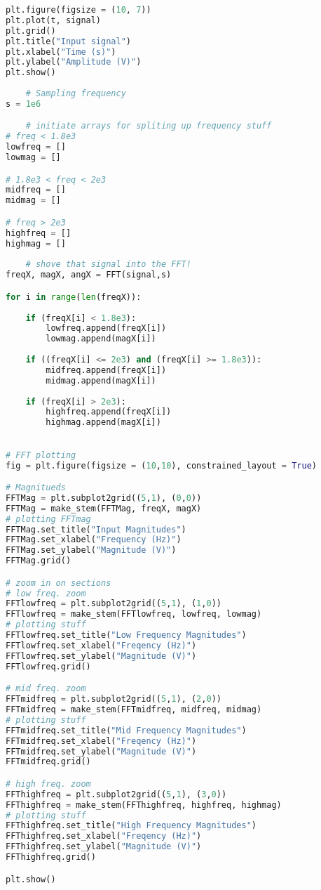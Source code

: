 \documentclass[12pt,a4paper]{article}
\begin{document}
\begin{lstlisting}[language=Python]
plt.figure(figsize = (10, 7))
plt.plot(t, signal)
plt.grid()
plt.title("Input signal")
plt.xlabel("Time (s)")
plt.ylabel("Amplitude (V)")
plt.show()
  
    # Sampling frequency
s = 1e6

    # initiate arrays for spliting up frequency stuff
# freq < 1.8e3
lowfreq = []
lowmag = []

# 1.8e3 < freq < 2e3
midfreq = []
midmag = []

# freq > 2e3 
highfreq = []
highmag = []
    
    # shove that signal into the FFT!
freqX, magX, angX = FFT(signal,s)

for i in range(len(freqX)):
    
    if (freqX[i] < 1.8e3):
        lowfreq.append(freqX[i])
        lowmag.append(magX[i])
    
    if ((freqX[i] <= 2e3) and (freqX[i] >= 1.8e3)):
        midfreq.append(freqX[i])
        midmag.append(magX[i])
        
    if (freqX[i] > 2e3):
        highfreq.append(freqX[i])
        highmag.append(magX[i])
        

# FFT plotting
fig = plt.figure(figsize = (10,10), constrained_layout = True)

# Magnitueds
FFTMag = plt.subplot2grid((5,1), (0,0))
FFTMag = make_stem(FFTMag, freqX, magX)
# plotting FFTmag
FFTMag.set_title("Input Magnitudes")
FFTMag.set_xlabel("Frequency (Hz)")
FFTMag.set_ylabel("Magnitude (V)")
FFTMag.grid()

# zoom in on sections
# low freq. zoom
FFTlowfreq = plt.subplot2grid((5,1), (1,0))
FFTlowfreq = make_stem(FFTlowfreq, lowfreq, lowmag)
# plotting stuff
FFTlowfreq.set_title("Low Frequency Magnitudes")
FFTlowfreq.set_xlabel("Freqency (Hz)")
FFTlowfreq.set_ylabel("Magnitude (V)")
FFTlowfreq.grid()

# mid freq. zoom
FFTmidfreq = plt.subplot2grid((5,1), (2,0))
FFTmidfreq = make_stem(FFTmidfreq, midfreq, midmag)
# plotting stuff
FFTmidfreq.set_title("Mid Frequency Magnitudes")
FFTmidfreq.set_xlabel("Freqency (Hz)")
FFTmidfreq.set_ylabel("Magnitude (V)")
FFTmidfreq.grid()

# high freq. zoom
FFThighfreq = plt.subplot2grid((5,1), (3,0))
FFThighfreq = make_stem(FFThighfreq, highfreq, highmag)
# plotting stuff
FFThighfreq.set_title("High Frequency Magnitudes")
FFThighfreq.set_xlabel("Freqency (Hz)")
FFThighfreq.set_ylabel("Magnitude (V)")
FFThighfreq.grid()

plt.show()



\end{lstlisting}
\end{document}
